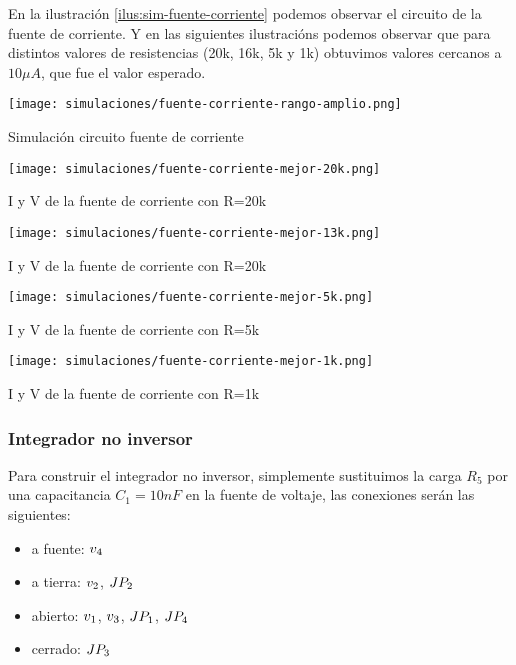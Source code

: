 En la ilustración \ref{ilus:sim-fuente-corriente} podemos observar el circuito de la fuente de corriente. Y en las siguientes ilustracións podemos observar que para distintos valores de resistencias (20k, 16k, 5k y 1k) obtuvimos valores cercanos a $10\mu A$, que fue el valor esperado.

\begin{ilustracion}[ht]
    \centering
    \texttt{[image: simulaciones/fuente-corriente-rango-amplio.png]}
    \caption{Simulación circuito fuente de corriente}
    \label{ilus:sim-fuente-corriente}
\end{ilustracion}
\begin{ilustracion}[ht]
    \centering
    \texttt{[image: simulaciones/fuente-corriente-mejor-20k.png]}
    \caption{I y V de la fuente de corriente con R=20k}
    \label{ilus:sim-fuente-corriente-20k}
\end{ilustracion}
\begin{ilustracion}[ht]
    \centering
    \texttt{[image: simulaciones/fuente-corriente-mejor-13k.png]}
    \caption{I y V de la fuente de corriente con R=20k}
    \label{ilus:sim-fuente-corriente-13k}
\end{ilustracion}
\begin{ilustracion}[ht]
    \centering
    \texttt{[image: simulaciones/fuente-corriente-mejor-5k.png]}
    \caption{I y V de la fuente de corriente con R=5k}
    \label{ilus:sim-fuente-corriente-5k}
\end{ilustracion}
\begin{ilustracion}[ht]
    \centering
    \texttt{[image: simulaciones/fuente-corriente-mejor-1k.png]}
    \caption{I y V de la fuente de corriente con R=1k}
    \label{ilus:sim-fuente-corriente-1k}
\end{ilustracion}


\FloatBarrier
\subsubsection{Integrador no inversor}

Para construir el integrador no inversor, simplemente sustituimos la carga $R_5$ por una capacitancia $C_1 = 10nF$ en la fuente de voltaje, las conexiones serán las siguientes:

\begin{itemize}
    \item a fuente: $\volt{4}$
    \item a tierra: $\volt{2}$, $\jumper{2}$
    \item abierto: $\volt{1}$, $\volt{3}$, $\jumper{1}$, $\jumper{4}$
    \item cerrado: $\jumper{3}$
\end{itemize}


